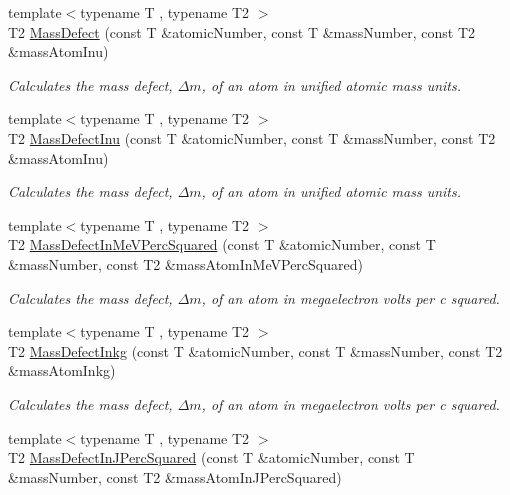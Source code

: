 \begin{DoxyCompactItemize}
{\footnotesize template$<$typename T , typename T2 $>$ }\\T2 \mbox{\hyperlink{group___e_g_x_phys-_mass_defect_gae89f2dfa65992c0314adc2440b2f582a}{Mass\+Defect}} (const T \&atomic\+Number, const T \&mass\+Number, const T2 \&mass\+Atom\+Inu)
\begin{DoxyCompactList}\small\item\em Calculates the mass defect, $\Delta m$, of an atom in unified atomic mass units. \end{DoxyCompactList}\item 
{\footnotesize template$<$typename T , typename T2 $>$ }\\T2 \mbox{\hyperlink{group___e_g_x_phys-_mass_defect_ga70400004a5cb622de372ab84670731ef}{Mass\+Defect\+Inu}} (const T \&atomic\+Number, const T \&mass\+Number, const T2 \&mass\+Atom\+Inu)
\begin{DoxyCompactList}\small\item\em Calculates the mass defect, $\Delta m$, of an atom in unified atomic mass units. \end{DoxyCompactList}\item 
{\footnotesize template$<$typename T , typename T2 $>$ }\\T2 \mbox{\hyperlink{group___e_g_x_phys-_mass_defect_gab51169bf871d0ea0ee0642fa300228fe}{Mass\+Defect\+In\+Me\+V\+Perc\+Squared}} (const T \&atomic\+Number, const T \&mass\+Number, const T2 \&mass\+Atom\+In\+Me\+V\+Perc\+Squared)
\begin{DoxyCompactList}\small\item\em Calculates the mass defect, $\Delta m$, of an atom in megaelectron volts per c squared. \end{DoxyCompactList}\item 
{\footnotesize template$<$typename T , typename T2 $>$ }\\T2 \mbox{\hyperlink{group___e_g_x_phys-_mass_defect_gad5378933021e13598a76bd8581b1e887}{Mass\+Defect\+Inkg}} (const T \&atomic\+Number, const T \&mass\+Number, const T2 \&mass\+Atom\+Inkg)
\begin{DoxyCompactList}\small\item\em Calculates the mass defect, $\Delta m$, of an atom in megaelectron volts per c squared. \end{DoxyCompactList}\item 
{\footnotesize template$<$typename T , typename T2 $>$ }\\T2 \mbox{\hyperlink{group___e_g_x_phys-_mass_defect_ga08cff1dfa3259af8f1b67ec741796e91}{Mass\+Defect\+In\+J\+Perc\+Squared}} (const T \&atomic\+Number, const T \&mass\+Number, const T2 \&mass\+Atom\+In\+J\+Perc\+Squared)

\end{DoxyCompactItemize}
